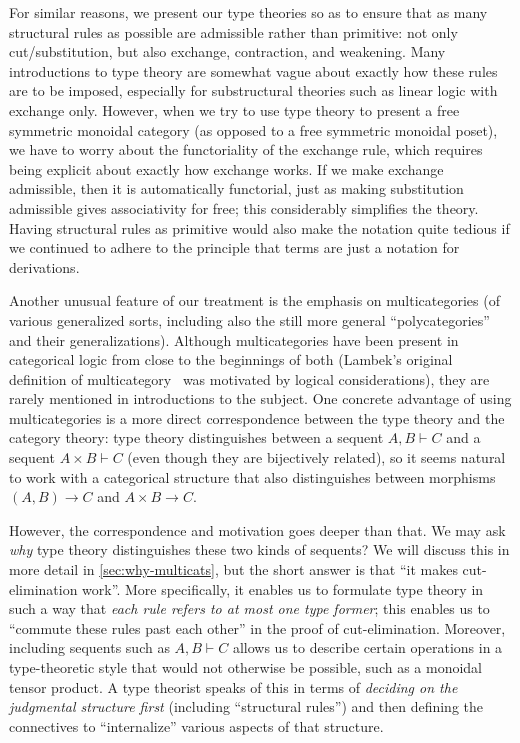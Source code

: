 \documentclass{book}
\let\types\vdash
\begin{document}
For similar reasons, we present our type theories so as to ensure that as many structural rules as possible are admissible rather than primitive: not only cut/substitution, but also exchange, contraction, and weakening.
Many introductions to type theory are somewhat vague about exactly how these rules are to be imposed, especially for substructural theories such as linear logic with exchange only.
However, when we try to use type theory to present a free symmetric monoidal category (as opposed to a free symmetric monoidal poset), we have to worry about the functoriality of the exchange rule, which requires being explicit about exactly how exchange works.
If we make exchange admissible, then it is automatically functorial, just as making substitution admissible gives associativity for free; this considerably simplifies the theory.
Having structural rules as primitive would also make the notation quite tedious if we continued to adhere to the principle that terms are just a notation for derivations.

Another unusual feature of our treatment is the emphasis on multicategories (of various generalized sorts, including also the still more general ``polycategories'' and their generalizations).
Although multicategories have been present in categorical logic from close to the beginnings of both (Lambek's original definition of multicategory~\cite{lambek:dedsys-ii} was motivated by logical considerations), they are rarely mentioned in introductions to the subject.
One concrete advantage of using multicategories is a more direct correspondence between the type theory and the category theory: type theory distinguishes between a sequent $A,B\types C$ and a sequent $A\times B\types C$ (even though they are bijectively related), so it seems natural to work with a categorical structure that also distinguishes between morphisms $(A,B)\to C$ and $A\times B\to C$.

However, the correspondence and motivation goes deeper than that.
We may ask \emph{why} type theory distinguishes these two kinds of sequents?
We will discuss this in more detail in \cref{sec:why-multicats}, but the short answer is that ``it makes cut-elimination work''.
More specifically, it enables us to formulate type theory in such a way that \emph{each rule refers to at most one type former}; this enables us to ``commute these rules past each other'' in the proof of cut-elimination.
Moreover, including sequents such as $A,B\types C$ allows us to describe certain operations in a type-theoretic style that would not otherwise be possible, such as a monoidal tensor product.
A type theorist speaks of this in terms of \emph{deciding on the judgmental structure first} (including ``structural rules'') and then defining the connectives to ``internalize'' various aspects of that structure.
\end{document}

